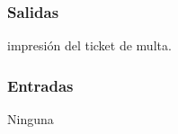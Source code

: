 
\subsubsection{Salidas}
	\begin{Citemize}
		\item impresión del ticket de multa. 
	\end{Citemize}
	
\subsubsection{Entradas}
	\begin{Citemize}
		\item Ninguna
	\end{Citemize}